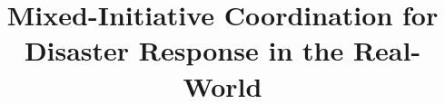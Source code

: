 \documentclass{aamas2014}
\begin{document}


\title{Mixed-Initiative Coordination for Disaster Response in the Real-World}




%
%
%
%

%

\end{document}
